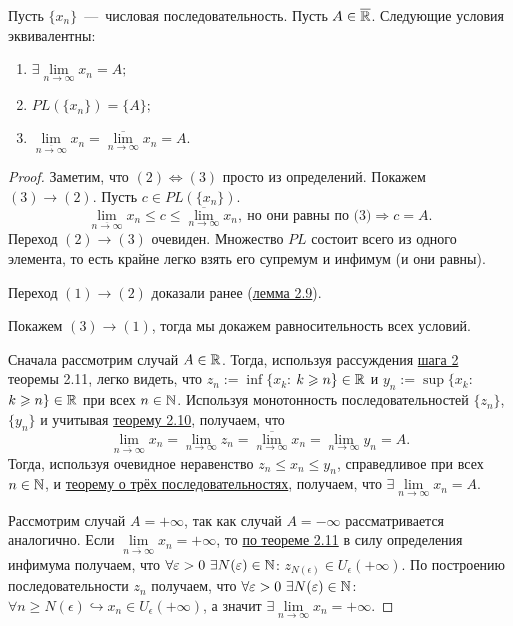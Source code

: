 \newpage

\begin{theorem}
    Пусть $\{ x_{n} \}$~---~числовая последовательность. Пусть $A \in \overline{\mathbb{R}}$. Следующие условия эквивалентны:
    \begin{enumerate}
        \item $\exists \lim\limits_{n\to \infty} x_{n} = A;$
        \item $PL (\{ x_{n} \}) = \{ A \};$
        \item $ \lim\limits_{\overline{n\to \infty}} x_{n} = \overline{\lim\limits_{n\to \infty}} x_{n} = A.$
    \end{enumerate}
\end{theorem}
\begin{proof}
    Заметим, что $(2) \Leftrightarrow (3)$ просто из определений. Покажем $(3) \to (2)$. Пусть $c \in PL (\{ x_{n} \})$.
    $$ \lim\limits_{\overline{n\to \infty}} x_{n} \leq c \leq \overline{\lim\limits_{n\to \infty}} x_{n}, \  \text{но они равны по (3)} \Rightarrow c = A. $$ Переход $(2) \to (3)$ очевиден. Множество $PL$ состоит всего из одного элемента, то есть крайне легко взять его супремум и инфимум (и они равны).

    Переход $(1) \to (2)$ доказали ранее (\hyperlink{lemm2.9}{лемма 2.9}).

    Покажем $(3) \to (1)$, тогда мы докажем равносительность всех условий.

    Сначала рассмотрим случай $A \in \mathbb{R}$. Тогда, используя рассуждения \hyperlink{step2}{шага 2} теоремы 2.11, легко видеть, что $z_{n} := \inf \{ x_{k}$: $k \geqslant n\} \in \mathbb{R}$ и $y_{n} := \sup \{ x_{k}$: $k \geqslant n\} \in \mathbb{R}$ при всех $n \in \mathbb{N}$. Используя монотонность последовательностей $\{ z_{n} \}$, $\{ y_{n} \}$ и учитывая \hyperlink{thm2.10}{теорему 2.10}, получаем, что
    $$ \lim\limits_{\overline{n\to \infty}} x_{n} = \lim\limits_{n\to \infty} z_{n} = \overline{\lim\limits_{n\to \infty}} x_{n} = \lim\limits_{n\to \infty} y_{n} = A.$$
    Тогда, используя очевидное неравенство $z_{n} \leq x_{n} \leq y_{n}$, справедливое при всех $n \in \mathbb{N}$, и \hyperlink{thm2.4}{теорему о трёх последовательностях}, получаем, что $\exists \lim\limits_{n\to \infty} x_{n} = A$.
    
    Рассмотрим случай $A = +\infty$, так как случай $A = -\infty$ рассматривается аналогично. Если $\lim\limits_{\overline{n\to \infty}} x_{n} = +\infty$, то \hyperlink{thm2.11}{по теореме 2.11} в силу определения инфимума получаем, что $\forall \varepsilon > 0 \  \exists N (\varepsilon) \in \mathbb{N}$: $z_{N (\epsilon)} \in U_{\epsilon} (+ \infty)$. По построению последовательности $z_{n}$ получаем, что $\forall \varepsilon > 0 \  \exists N (\varepsilon) \in \mathbb{N}$: $\forall n \geq N (\epsilon) \hookrightarrow x_{n} \in U_{\epsilon} (+ \infty)$, а значит $\exists \lim\limits_{n\to \infty} x_{n} = +\infty$.
\end{proof}

